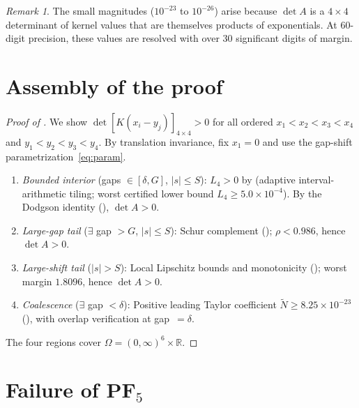 \documentclass[11pt,a4paper]{amsart}
\theoremstyle{definition}
\theoremstyle{remark}
\newtheorem{remark}[theorem]{Remark}
\newcommand{\Ntilde}{\tilde{N}}
\newcommand{\R}{\mathbb{R}}
\begin{document}
\begin{remark}
The small magnitudes ($10^{-23}$ to $10^{-26}$) arise because
$\det A$ is a $4\times 4$ determinant of kernel values that are
themselves products of exponentials.
At $60$-digit precision, these values are resolved with
over $30$ significant digits of margin.
\end{remark}


\section{Assembly of the proof}\label{sec:assembly}

\begin{proof}[Proof of ]
We show $\det[K(x_i - y_j)]_{4\times 4} > 0$ for all
ordered $x_1 < x_2 < x_3 < x_4$ and
$y_1 < y_2 < y_3 < y_4$.
By translation invariance, fix $x_1 = 0$
and use the gap-shift parametrization~\eqref{eq:param}.

\begin{enumerate}[label=(\roman*)]
\item \emph{Bounded interior}
  (gaps $\in [\delta, G]$, $|s| \le S$):
  $L_4 > 0$ by  (adaptive interval-arithmetic
  tiling; worst certified lower bound $L_4 \ge 5.0 \times 10^{-4}$).
  By the Dodgson identity (), $\det A > 0$.

\item \emph{Large-gap tail}
  ($\exists$ gap $> G$, $|s| \le S$):
  Schur complement ();
  $\rho < 0.986$, hence $\det A > 0$.

\item \emph{Large-shift tail} ($|s| > S$):
  Local Lipschitz bounds and monotonicity ();
  worst margin $1.8096$, hence $\det A > 0$.

\item \emph{Coalescence} ($\exists$ gap $< \delta$):
  Positive leading Taylor coefficient
  $\Ntilde \ge 8.25 \times 10^{-23}$ (),
  with overlap verification at gap~$= \delta$.
\end{enumerate}
The four regions cover $\Omega = (0,\infty)^6 \times \R$.
\end{proof}


\section{Failure of PF\texorpdfstring{$_5$}{5}}\label{sec:pf5}
\end{document}
